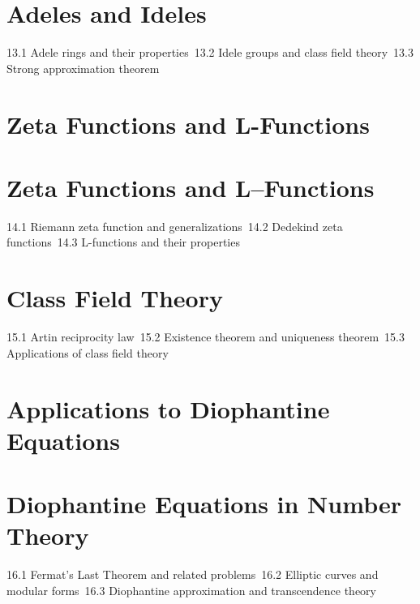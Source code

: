 \section{Adeles and Ideles}
13.1 Adele rings and their properties\
13.2 Idele groups and class field theory\
13.3 Strong approximation theorem\
\section{Zeta Functions and L-Functions}
\section{Zeta Functions and L–Functions}
14.1 Riemann zeta function and generalizations\
14.2 Dedekind zeta functions\
14.3 L-functions and their properties\
\section{Class Field Theory}
15.1 Artin reciprocity law\
15.2 Existence theorem and uniqueness theorem\
15.3 Applications of class field theory\
\section{Applications to Diophantine Equations}
\section{Diophantine Equations in Number Theory}
16.1 Fermat's Last Theorem and related problems\
16.2 Elliptic curves and modular forms\
16.3 Diophantine approximation and transcendence theory\
